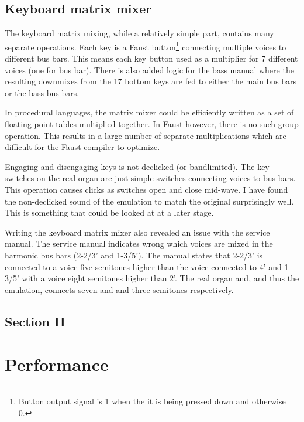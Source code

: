 \documentclass[11pt,a4paper]{article}
\begin{document}



\subsection{Keyboard matrix mixer}

The keyboard matrix mixing, while a relatively simple part, contains many separate operations. Each key is a Faust button\footnote{Button output signal is 1 when the it is being pressed down and otherwise 0.} connecting multiple voices to different bus bars. This means each key button used as a multiplier for 7 different voices (one for bus bar). There is also added logic for the bass manual where the resulting downmixes from the 17 bottom keys are fed to either the main bus bars or the bass bus bars.

In procedural languages, the matrix mixer could be efficiently written as a set of floating point tables multiplied together. In Faust however, there is no such group operation. This results in a large number of separate multiplications which are difficult for the Faust compiler to optimize.

Engaging and disengaging keys is not declicked (or bandlimited). The key switches on the real organ are just simple switches connecting voices to bus bars. This operation causes clicks as switches open and close mid-wave. I have found the non-declicked sound of the emulation to match the original surprisingly well. This is something that could be looked at at a later stage.

Writing the keyboard matrix mixer also revealed an issue with the service manual. The service manual indicates wrong which voices are mixed in the harmonic bus bars (2-2/3' and 1-3/5'). The manual states that 2-2/3' is connected to a voice five semitones higher than the voice connected to 4' and 1-3/5' with a voice eight semitones higher than 2'. The real organ and, and thus the emulation, connects seven and and three semitones respectively.


\subsection{Section II}



\section{Performance}
\end{document}
